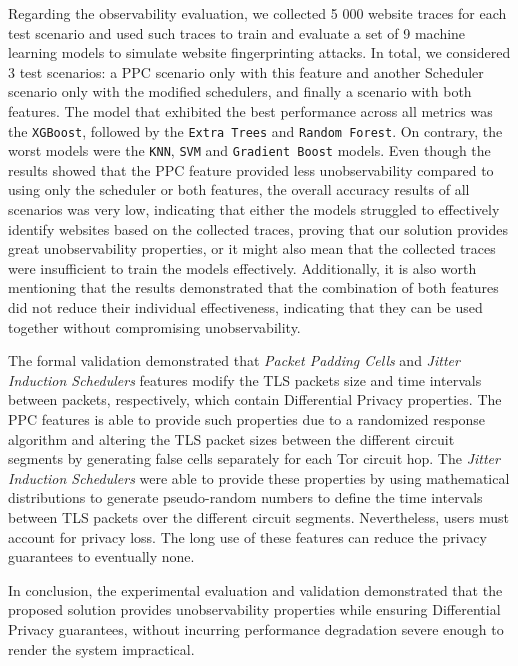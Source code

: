 Regarding the observability evaluation, we collected 5 000 website traces for each test scenario and used such traces to train and evaluate a set of 9 machine learning models to simulate website fingerprinting attacks. In total, we considered 3 test scenarios: a PPC scenario only with this feature and another Scheduler scenario only with the modified schedulers, and finally a scenario with both features. The model that exhibited the best performance across all metrics was the \texttt{XGBoost}, followed by the \texttt{Extra Trees} and \texttt{Random Forest}. On contrary, the worst models were the \texttt{KNN}, \texttt{SVM} and \texttt{Gradient Boost} models. Even though the results showed that the PPC feature provided less unobservability compared to using only the scheduler or both features, the overall accuracy results of all scenarios was very low, indicating that either the models struggled to effectively identify websites based on the collected traces, proving that our solution provides great unobservability properties, or it might also mean that the collected traces were insufficient to train the models effectively. Additionally, it is also worth mentioning that the results demonstrated that the combination of both features did not reduce their individual effectiveness, indicating that they can be used together without compromising unobservability.

The formal validation demonstrated that \textit{Packet Padding Cells} and \textit{Jitter Induction Schedulers} features modify the TLS packets size and time intervals between packets, respectively, which contain Differential Privacy properties. The PPC features is able to provide such properties due to a randomized response algorithm and altering the TLS packet sizes between the different circuit segments by generating false cells separately for each Tor circuit hop. The \textit{Jitter Induction Schedulers} were able to provide these properties by using mathematical distributions to generate pseudo-random numbers to define the time intervals between TLS packets over the different circuit segments. Nevertheless, users must account for privacy loss. The long use of these features can reduce the privacy guarantees to eventually none.

In conclusion, the experimental evaluation and validation demonstrated that the proposed solution provides unobservability properties while ensuring Differential Privacy guarantees, without incurring performance degradation severe enough to render the system impractical.

